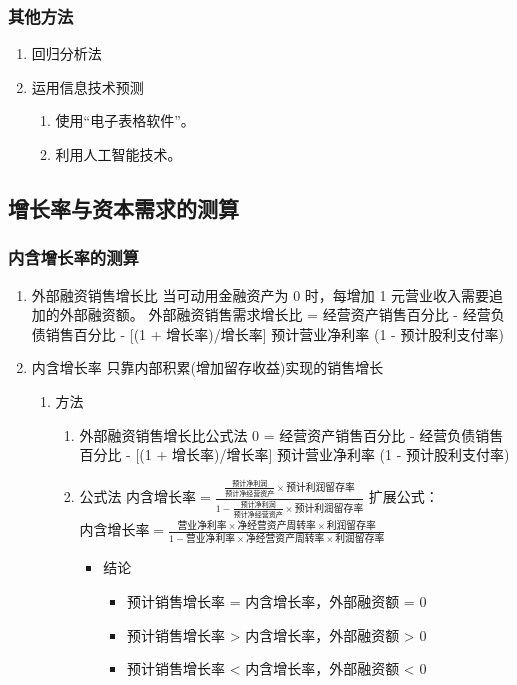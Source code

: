\documentclass[11pt]{article}
\begin{document}
\subsubsection{其他方法}
\label{sec:org3d706d8}
\begin{enumerate}
\item 回归分析法
\item 运用信息技术预测
\begin{enumerate}
\item 使用“电子表格软件”。
\item 利用人工智能技术。
\end{enumerate}
\end{enumerate}
\subsection{增长率与资本需求的测算}
\label{sec:orgfee7221}
\subsubsection{内含增长率的测算}
\label{sec:orge67cbeb}
\begin{enumerate}
\item 外部融资销售增长比
\label{sec:org3533eb1}
当可动用金融资产为 0 时，每增加 1 元营业收入需要追加的外部融资额。
外部融资销售需求增长比 = 经营资产销售百分比 - 经营负债销售百分比 - [(1 + 增长率)/增长率] \texttimes{} 预计营业净利率 \texttimes{} (1 - 预计股利支付率)
\item 内含增长率
\label{sec:orgf08daa6}
只靠内部积累(增加留存收益)实现的销售增长
\begin{enumerate}
\item 方法
\label{sec:orgbd3003e}
\begin{enumerate}
\item 外部融资销售增长比公式法
\label{sec:orgf48edda}
0 = 经营资产销售百分比 - 经营负债销售百分比 - [(1 + 增长率)/增长率] \texttimes{} 预计营业净利率 \texttimes{} (1 - 预计股利支付率)
\item 公式法
\label{sec:orgd0dd732}
\(内含增长率 = \frac{\frac{预计净利润}{预计净经营资产}\times 预计利润留存率}{1-\frac{预计净利润}{预计净经营资产}\times 预计利润留存率}\)
扩展公式：\(内含增长率=\frac{营业净利率 \times 净经营资产周转率 \times 利润留存率}{1-营业净利率\times 净经营资产周转率\times 利润留存率}\)
\begin{itemize}
\item 结论
\begin{itemize}
\item 预计销售增长率 = 内含增长率，外部融资额 = 0
\item 预计销售增长率 > 内含增长率，外部融资额 > 0
\item 预计销售增长率 < 内含增长率，外部融资额 < 0
\end{itemize}
\end{itemize}
\end{enumerate}
\end{enumerate}
\end{enumerate}
\end{document}
